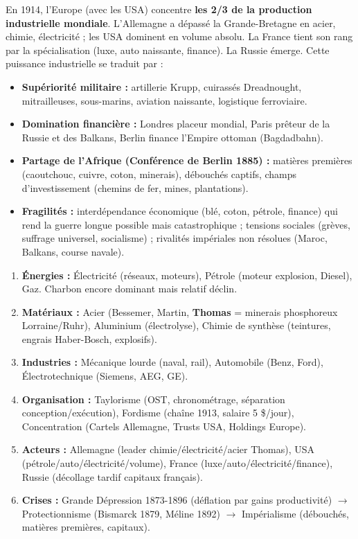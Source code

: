 \documentclass[11pt]{article}
\begin{document}
En 1914, l'Europe (avec les USA) concentre \textbf{les 2/3 de la production industrielle mondiale}. L'Allemagne a dépassé la Grande-Bretagne en acier, chimie, électricité ; les USA dominent en volume absolu. La France tient son rang par la spécialisation (luxe, auto naissante, finance). La Russie émerge. Cette puissance industrielle se traduit par :
\begin{itemize}
    \item \textbf{Supériorité militaire :} artillerie Krupp, cuirassés Dreadnought, mitrailleuses, sous-marins, aviation naissante, logistique ferroviaire.
    \item \textbf{Domination financière :} Londres placeur mondial, Paris prêteur de la Russie et des Balkans, Berlin finance l'Empire ottoman (Bagdadbahn).
    \item \textbf{Partage de l'Afrique (Conférence de Berlin 1885) :} matières premières (caoutchouc, cuivre, coton, minerais), débouchés captifs, champs d'investissement (chemins de fer, mines, plantations).
    \item \textbf{Fragilités :} interdépendance économique (blé, coton, pétrole, finance) qui rend la guerre longue possible mais catastrophique ; tensions sociales (grèves, suffrage universel, socialisme) ; rivalités impériales non résolues (Maroc, Balkans, course navale).
\end{itemize}

\begin{aretenir}
\begin{enumerate}
    \item \textbf{Énergies :} Électricité (réseaux, moteurs), Pétrole (moteur explosion, Diesel), Gaz. Charbon encore dominant mais relatif déclin.
    \item \textbf{Matériaux :} Acier (Bessemer, Martin, \textbf{Thomas} = minerais phosphoreux Lorraine/Ruhr), Aluminium (électrolyse), Chimie de synthèse (teintures, engrais Haber-Bosch, explosifs).
    \item \textbf{Industries :} Mécanique lourde (naval, rail), Automobile (Benz, Ford), Électrotechnique (Siemens, AEG, GE).
    \item \textbf{Organisation :} Taylorisme (OST, chronométrage, séparation conception/exécution), Fordisme (chaîne 1913, salaire 5 \$/jour), Concentration (Cartels Allemagne, Trusts USA, Holdings Europe).
    \item \textbf{Acteurs :} Allemagne (leader chimie/électricité/acier Thomas), USA (pétrole/auto/électricité/volume), France (luxe/auto/électricité/finance), Russie (décollage tardif capitaux français).
    \item \textbf{Crises :} Grande Dépression 1873-1896 (déflation par gains productivité) $\to$ Protectionnisme (Bismarck 1879, Méline 1892) $\to$ Impérialisme (débouchés, matières premières, capitaux).
\end{enumerate}
\end{aretenir}
\end{document}
